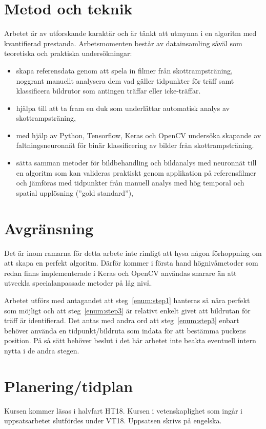 \documentclass[a4paper,12pt]{article}
\begin{document}
\section*{Metod och teknik}
Arbetet är av utforskande karaktär och är tänkt att utmynna i en algoritm
med kvantifierad prestanda. Arbetsmomenten består av datainsamling såväl
som teoretiska och praktiska undersökningar:
\begin{itemize}
  \item skapa referensdata genom att spela in filmer från skottrampsträning,
    noggrant manuellt analysera dem vad gäller tidpunkter för träff samt
    klassificera bildrutor som antingen träffar eller icke-träffar.
  \item hjälpa till att ta fram en duk som underlättar automatisk analys av
    skottrampsträning,
  \item med hjälp av Python, Tensorflow, Keras och OpenCV undersöka
    skapande av faltningsneuronnät för binär klassificering av bilder
    från skottrampsträning.
  \item sätta samman metoder för bildbehandling och bildanalys med
    neuronnät till en algoritm som kan valideras praktiskt genom applikation
    på referensfilmer och jämföras med tidpunkter från manuell analys med
    hög temporal och spatial upplösning (''gold standard''),
\end{itemize}


\section*{Avgränsning}
Det är inom ramarna för detta arbete inte rimligt att hysa någon förhoppning
om att skapa en perfekt algoritm. Därför kommer i första hand högnivåmetoder
som redan finns implementerade i Keras och OpenCV användas snarare än att
utveckla specialanpassade metoder på låg nivå.

Arbetet utförs med antagandet att steg~\ref{enum:step1} hanteras så nära
perfekt som möjligt och att steg~\ref{enum:step3} är relativt enkelt givet
att bildrutan för träff är identifierad. Det antas med andra ord att
steg~\ref{enum:step3} enbart behöver använda en tidpunkt/bildruta som indata
för att bestämma puckens position. På så sätt behöver beslut i det här
arbetet inte beakta eventuell intern nytta i de andra stegen.


\pagebreak
\section*{Planering/tidplan}
Kursen kommer läsas i halvfart HT18. Kursen i vetenskaplighet som ingår
i uppsatsarbetet slutfördes under VT18. Uppsatsen skrivs på engelska.
\end{document}
